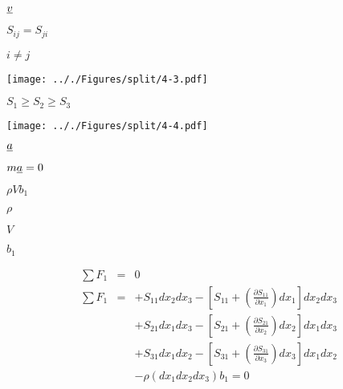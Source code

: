 \documentclass[onecolumn,11pt]{report}
\def\lthtmlcheckvsize{\ifdim\ht\sizebox<\vsize 
  \ifdim\wd\sizebox<\hsize\expandafter\hfill\fi \expandafter\vfill
  \else\expandafter\vss\fi}%
\begin{document}
{\newpage\clearpage
{}%
$ \uline{v}$%
\lthtmlindisplaymathZ
\lthtmlcheckvsize\clearpage}

{\newpage\clearpage
{}%
$ S_{ij}=S_{ji}$%
\lthtmlindisplaymathZ
\lthtmlcheckvsize\clearpage}

{\newpage\clearpage
{}%
$ i \neq j$%
\lthtmlindisplaymathZ
\lthtmlcheckvsize\clearpage}

{\newpage\clearpage
{}%
\texttt{[image: .././Figures/split/4-3.pdf]}%
\lthtmlpictureZ
\lthtmlcheckvsize\clearpage}

{\newpage\clearpage
{}%
$ S_1 \geq S_2 \geq S_3$%
\lthtmlindisplaymathZ
\lthtmlcheckvsize\clearpage}

{\newpage\clearpage
{}%
\texttt{[image: .././Figures/split/4-4.pdf]}%
\lthtmlpictureZ
\lthtmlcheckvsize\clearpage}

{\newpage\clearpage
{}%
$ \uline{a}$%
\lthtmlindisplaymathZ
\lthtmlcheckvsize\clearpage}

{\newpage\clearpage
{}%
$ m \uline{a} = 0$%
\lthtmlindisplaymathZ
\lthtmlcheckvsize\clearpage}

{\newpage\clearpage
{}%
$ \rho V b_1$%
\lthtmlindisplaymathZ
\lthtmlcheckvsize\clearpage}

{\newpage\clearpage
{}%
$ \rho$%
\lthtmlindisplaymathZ
\lthtmlcheckvsize\clearpage}

{\newpage\clearpage
{}%
$ V$%
\lthtmlindisplaymathZ
\lthtmlcheckvsize\clearpage}

{\newpage\clearpage
{}%
$ b_1$%
\lthtmlindisplaymathZ
\lthtmlcheckvsize\clearpage}

{\newpage\clearpage
{}%
\begin{displaymath}\begin{array}{rcl}
\sum F_1 & = & 0 \\
\sum F_1 & =
& + S_{11} dx_2 dx_3 - \left[ S_{11} + (\frac{\partial S_{11}}{\partial x_1}) dx_1 \right] dx_2 dx_3 \\
& & + S_{21} dx_1 dx_3 - \left[ S_{21} + (\frac{\partial S_{21}}{\partial x_2}) dx_2 \right] dx_1 dx_3 \\
& & + S_{31} dx_1 dx_2 - \left[ S_{31} + (\frac{\partial S_{31}}{\partial x_3}) dx_3 \right] dx_1 dx_2 \\
& & - \rho (dx_1 dx_2 dx_3) b_1 = 0
\end{array}\end{displaymath}%
\lthtmldisplayZ
\lthtmlcheckvsize\clearpage}
\end{document}
